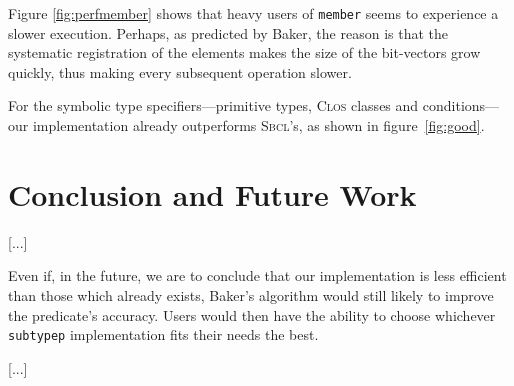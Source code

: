 \documentclass[format=sigconf]{acmart}
\newcommand\code[2][\small]{\sloppy\texttt{#1#2}}
\theoremstyle{definition}
\newcommand\sbcl{\textsc{Sbcl}}
\begin{document}
Figure \ref{fig:perfmember} shows that heavy users of \code{member} seems to
experience a slower execution. Perhaps, as predicted by Baker, the reason is
that the systematic registration of the elements makes the size of the
bit-vectors grow quickly, thus making every subsequent operation slower.

For the symbolic type specifiers---primitive types, \textsc{Clos} classes and
conditions---our implementation already outperforms \sbcl's, as shown in
figure~\ref{fig:good}.

\section{Conclusion and Future Work}
[...]

Even if, in the future, we are to conclude that our implementation is less
efficient than those which already exists, Baker's algorithm would still likely to
improve the predicate's accuracy. Users would then have the ability to
choose whichever \code{subtypep} implementation fits their needs the best.

[...]


\end{document}
